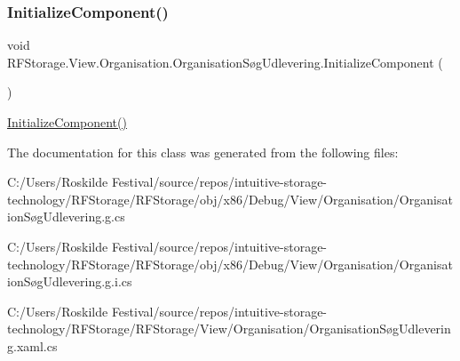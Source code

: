 \subsubsection{\texorpdfstring{InitializeComponent()}{InitializeComponent()}}
{\footnotesize\ttfamily void R\+F\+Storage.\+View.\+Organisation.\+Organisation\+Søg\+Udlevering.\+Initialize\+Component (\begin{DoxyParamCaption}{ }\end{DoxyParamCaption})}



\mbox{\hyperlink{class_r_f_storage_1_1_view_1_1_organisation_1_1_organisation_s_xC3_xB8g_udlevering_aaa5ca0ca81611f8a538b954a449382cf}{Initialize\+Component()}} 



The documentation for this class was generated from the following files\+:\begin{DoxyCompactItemize}
\item 
C\+:/\+Users/\+Roskilde Festival/source/repos/intuitive-\/storage-\/technology/\+R\+F\+Storage/\+R\+F\+Storage/obj/x86/\+Debug/\+View/\+Organisation/Organisation\+Søg\+Udlevering.\+g.\+cs\item 
C\+:/\+Users/\+Roskilde Festival/source/repos/intuitive-\/storage-\/technology/\+R\+F\+Storage/\+R\+F\+Storage/obj/x86/\+Debug/\+View/\+Organisation/Organisation\+Søg\+Udlevering.\+g.\+i.\+cs\item 
C\+:/\+Users/\+Roskilde Festival/source/repos/intuitive-\/storage-\/technology/\+R\+F\+Storage/\+R\+F\+Storage/\+View/\+Organisation/Organisation\+Søg\+Udlevering.\+xaml.\+cs\end{DoxyCompactItemize}
